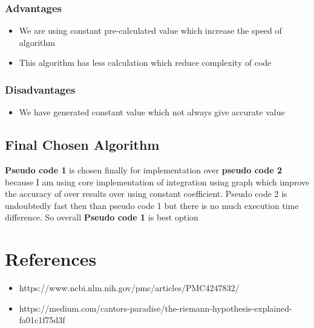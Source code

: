 \documentclass{article}
\begin{document}
\subsubsection{Advantages}
\begin{itemize}
\item We are using constant pre-calculated value which increase the speed of algorithm
\item This algorithm has less calculation which reduce complexity of code
\end{itemize}
\subsubsection{Disadvantages}
\begin{itemize}
\item We have generated constant value which not always give accurate value
\end{itemize}

\subsection{Final Chosen Algorithm}
\textbf{Pseudo code 1} is chosen finally for implementation over \textbf{pseudo code 2} because I am using core implementation of integration using graph which improve the accuracy of over results over using constant coefficient. Pseudo code 2 is undoubtedly fast then than pseudo code 1 but there is no much execution time difference. So overall \textbf{Pseudo code 1} is best option

\section{References}
\begin{itemize}
\item https://www.ncbi.nlm.nih.gov/pmc/articles/PMC4247832/
\item https://medium.com/cantors-paradise/the-riemann-hypothesis-explained-fa01c1f75d3f
\end{itemize}
\end{document}
